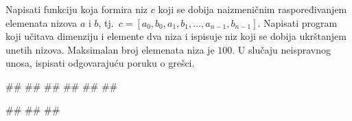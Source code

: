 \begin{Exercise}[label=v.ukrstanje_nizova]
Napisati funkciju  
koja formira niz $c$ koji se dobija naizmeničnim raspoređivanjem elemenata nizova $a$ i $b$, 
tj.~$c = [a_0, b_0, a_1, b_1, \ldots, a_{n-1}, b_{n-1}]$. 
Napisati program koji učitava dimenziju i elemente dva niza i ispisuje niz koji se dobija
ukrštanjem unetih nizova. 
Maksimalan broj elemenata niza je $100$.
U slučaju neispravnog unosa, ispisati odgovarajuću poruku o grešci. 

\begin{miditest}
\begin{upotreba}{1}
#\naslovInt#
##
##
##
##
##
\end{upotreba}
\end{miditest}
\begin{miditest}
\begin{upotreba}{2}
#\naslovInt#
##
##
\end{upotreba}
\end{miditest}
\end{Exercise}

\ifresenja
\begin{Answer}[ref=v.ukrstanje_nizova]
\end{Answer}
\fi



